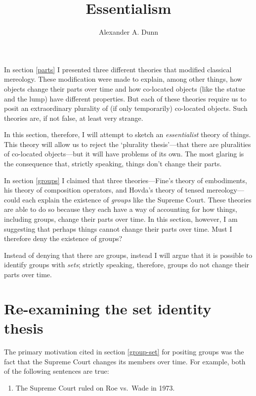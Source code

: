 \documentclass[11pt]{article}
\title{Essentialism}
\author{Alexander A. Dunn}
\begin{document}
\ifstandalone
\maketitle
\begin{spacing}{1.5}
\fi

\label{essential}

In section \ref{parts} I presented three different theories that
modified classical mereology.  These modification were made to
explain, among other things, how objects change their parts over time
and how co-located objects (like the statue and the lump) have
different properties.  But each of these theories require us to posit
an extraordinary plurality of (if only temporarily) co-located
objects.  Such theories are, if not false, at least very strange.

In this section, therefore, I will attempt to sketch an {\em
  essentialist} theory of things.  This theory will allow us to reject
the `plurality thesis'---that there are pluralities of co-located
objects---but it will have problems of its own.  The most glaring is
the consequence that, strictly speaking, things don't change their
parts.

In section \ref{groups} I claimed that three theories---Fine's theory
of embodiments, his theory of composition operators, and Hovda's
theory of tensed mereology---could each explain the existence of {\em
  groups} like the Supreme Court.  These theories are able to do so
because they each have a way of accounting for how things, including
groups, change their parts over time.  In this section, however, I am
suggesting that perhaps things cannot change their parts over time.
Must I therefore deny the existence of groups?

Instead of denying that there are groups, instead I will argue that it
is possible to identify groups with {\em sets}; strictly speaking,
therefore, groups do not change their parts over time.

\section{Re-examining the set identity thesis}
\label{set-id}
The primary motivation cited in section \ref{group-set} for positing
groups was the fact that the Supreme Court changes its members over
time.  For example, both of the following sentences are true:

\begin{enumerate}[label=(\arabic*)]
  \item The Supreme Court ruled on Roe vs.\ Wade in 1973. \label{roe1}


\end{enumerate}
\end{spacing}
\end{document}
